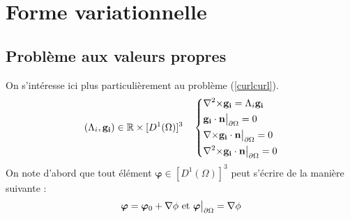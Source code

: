 \section{Forme variationnelle}
\label{fv}
\subsection{Problème aux valeurs propres}
\label{eigen}

On s'intéresse ici plus particulièrement au problème (\ref{curlcurl}).
\begin{equation}
\label{pbeigen}
(\Lambda_i,\mathbf{g_i})\in{\mathbb{R}}\times [D^1(\Omega)]^3\quad \left\{
\begin{aligned}
&{\nabla^2\times}  \mathbf{g_i} = \Lambda_i \mathbf{g_i}\\
&\mathbf{g_i}\cdot \mathbf{n}{\big\rvert_{\partial\Omega}} = 0\\
&{\nabla\times} \mathbf{g_i}\cdot \mathbf{n}{\big\rvert_{\partial\Omega}} = 0\\
&{\nabla^2\times}  \mathbf{g_i}\cdot \mathbf{n}{\big\rvert_{\partial\Omega}} = 0
\end{aligned}
\right.
\end{equation}
On note d'abord que tout élément $\bm{\varphi}\in [D^1(\Omega)]^3$ peut s'écrire de la manière suivante :
\[
\bm{\varphi} = \bm{\varphi}_0 + {\nabla}\phi\text{ et } \bm{\varphi}{\big\rvert_{\partial\Omega}} = {\nabla}\phi
\]

